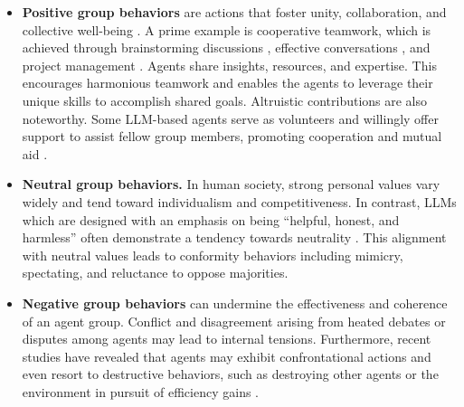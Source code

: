 \begin{itemize}[leftmargin=*]
    \item \textbf{Positive group behaviors} are actions that foster unity, collaboration, and collective well-being \cite{DBLP:journals/corr/abs-2304-03442, DBLP:journals/corr/abs-2307-07924, DBLP:journals/corr/abs-2308-07201, DBLP:journals/corr/abs-2307-04738, DBLP:journals/corr/abs-2308-08155,DBLP:journals/corr/abs-2308-11339}. 
    A prime example is cooperative teamwork, which is achieved through brainstorming discussions \cite{DBLP:journals/corr/abs-2308-07201}, effective conversations \cite{DBLP:journals/corr/abs-2308-08155}, and project management \cite{DBLP:journals/corr/abs-2308-00352}. Agents share insights, resources, and expertise. 
    This encourages harmonious teamwork and enables the agents to leverage their unique skills to accomplish shared goals. 
    Altruistic contributions are also noteworthy. 
    Some LLM-based agents serve as volunteers and willingly offer support to assist fellow group members, promoting cooperation and mutual aid \cite{DBLP:journals/corr/abs-2308-10848}.
    \item \textbf{Neutral group behaviors.} In human society, strong personal values vary widely and tend toward individualism and competitiveness. 
    In contrast, LLMs which are designed with an emphasis on being ``helpful, honest, and harmless'' \cite{DBLP:journals/corr/abs-2112-00861} often demonstrate a tendency towards neutrality \cite{DBLP:journals/corr/abs-2305-17147}. This alignment with neutral values leads to conformity behaviors including mimicry, spectating, and reluctance to oppose majorities.
    \item \textbf{Negative group behaviors} can undermine the effectiveness and coherence of an agent group.
    Conflict and disagreement arising from heated debates or disputes among agents may lead to internal tensions. 
    Furthermore, recent studies have revealed that agents may exhibit confrontational actions \cite{xu2023exploring} and even resort to destructive behaviors, such as destroying other agents or the environment in pursuit of efficiency gains \cite{DBLP:journals/corr/abs-2308-10848}.
\end{itemize}

